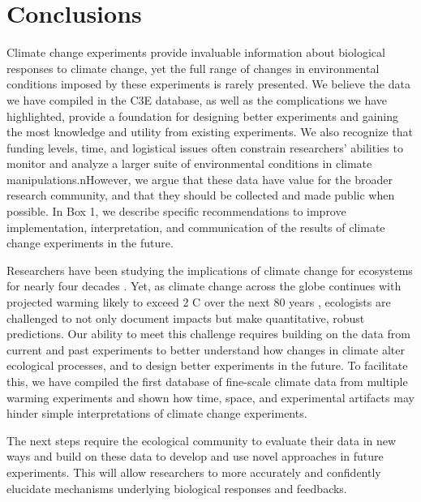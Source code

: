 \documentclass{article}
\begin{document}
\section* {Conclusions}
 \par Climate change experiments provide invaluable information about biological responses to climate change, yet the full range of changes in environmental conditions imposed by these experiments is rarely presented. We believe the data we have compiled in the C3E database, as well as the complications we have highlighted, provide a foundation for designing better experiments and gaining the most knowledge and utility from existing experiments. We also recognize that funding levels, time, and logistical issues often constrain researchers' abilities to monitor and analyze a larger suite of environmental conditions in climate manipulations.nHowever, we argue that these data have value for the broader research community, and that they should be collected and made public when possible. In Box 1, we describe specific recommendations to improve implementation, interpretation, and communication of the results of climate change experiments in the future.
 \par Researchers have been studying the implications of climate change for ecosystems for nearly four decades \citep[e.g.,][]{tamaki1981,carlson1982}.
Yet, as climate change across the globe continues with projected warming likely to exceed 2 \degree C over the next 80 years \citep{ipcc2013}, ecologists are challenged to not only document impacts but make quantitative, robust predictions. Our ability to meet this challenge requires building on the data from current and past experiments to better understand how changes in climate alter ecological processes, and to design better experiments in the future. To facilitate this, we have compiled the first database of fine-scale climate data from multiple warming experiments and shown how time, space, and experimental artifacts may hinder simple interpretations of climate change experiments. 

\par The next steps require the ecological community to evaluate their data in new ways and build on these data to develop and use novel approaches in future experiments. This will allow researchers to more accurately and confidently elucidate mechanisms underlying biological responses and feedbacks. %
\end{document}
